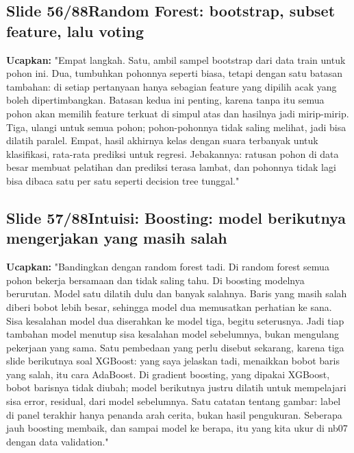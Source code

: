 \documentclass[11pt]{article}
\renewcommand{\framebox}[1]{\colorbox{acc!15}{\textcolor{acc}{\textbf{#1}}}}
\begin{document}
\subsection*{\framebox{Slide 56/88}\quad Random Forest: bootstrap, subset feature, lalu voting}
\textbf{Ucapkan:} "Empat langkah. Satu, ambil sampel bootstrap dari data train untuk pohon ini. Dua, tumbuhkan pohonnya seperti biasa, tetapi dengan satu batasan tambahan: di setiap pertanyaan hanya sebagian feature yang dipilih acak yang boleh dipertimbangkan. Batasan kedua ini penting, karena tanpa itu semua pohon akan memilih feature terkuat di simpul atas dan hasilnya jadi mirip-mirip. Tiga, ulangi untuk semua pohon; pohon-pohonnya tidak saling melihat, jadi bisa dilatih paralel. Empat, hasil akhirnya kelas dengan suara terbanyak untuk klasifikasi, rata-rata prediksi untuk regresi. Jebakannya: ratusan pohon di data besar membuat pelatihan dan prediksi terasa lambat, dan pohonnya tidak lagi bisa dibaca satu per satu seperti decision tree tunggal."\\[2pt]

\subsection*{\framebox{Slide 57/88}\quad Intuisi: Boosting: model berikutnya mengerjakan yang masih salah}
\textbf{Ucapkan:} "Bandingkan dengan random forest tadi. Di random forest semua pohon bekerja bersamaan dan tidak saling tahu. Di boosting modelnya berurutan. Model satu dilatih dulu dan banyak salahnya. Baris yang masih salah diberi bobot lebih besar, sehingga model dua memusatkan perhatian ke sana. Sisa kesalahan model dua diserahkan ke model tiga, begitu seterusnya. Jadi tiap tambahan model menutup sisa kesalahan model sebelumnya, bukan mengulang pekerjaan yang sama. Satu pembedaan yang perlu disebut sekarang, karena tiga slide berikutnya soal XGBoost: yang saya jelaskan tadi, menaikkan bobot baris yang salah, itu cara AdaBoost. Di gradient boosting, yang dipakai XGBoost, bobot barisnya tidak diubah; model berikutnya justru dilatih untuk mempelajari sisa error, residual, dari model sebelumnya. Satu catatan tentang gambar: label di panel terakhir hanya penanda arah cerita, bukan hasil pengukuran. Seberapa jauh boosting membaik, dan sampai model ke berapa, itu yang kita ukur di nb07 dengan data validation."\\[2pt]
\end{document}
